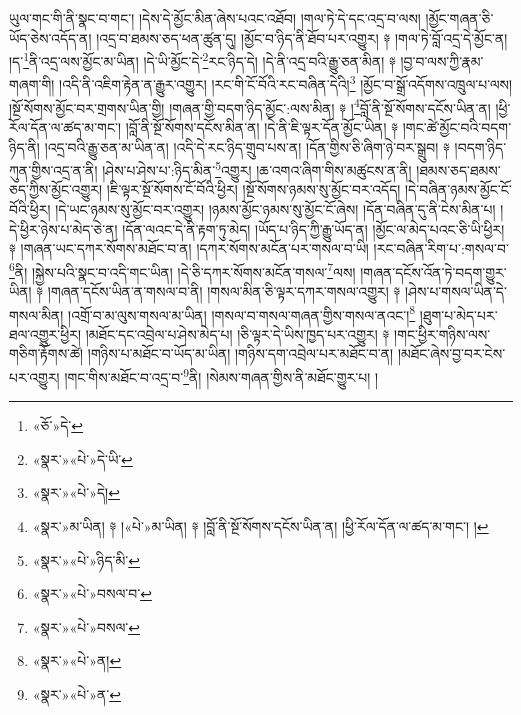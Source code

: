 ཡུལ་གང་གི་ནི་སྣང་བ་གང་། །དེས་དེ་མྱོང་མིན་ཞེས་པའང་འཐོབ། །གལ་ཏེ་དེ་དང་འདྲ་བ་ལས། །མྱོང་གཞན་ཅི་ཡོད་ཅེས་འདོད་ན། །འདྲ་བ་ཐམས་ཅད་ཕན་ཚུན་དུ། །མྱོང་བ་ཉིད་ནི་ཐོབ་པར་འགྱུར། ༈ །གལ་ཏེ་བློ་འདྲ་དེ་མྱོང་ན། །ད་\footnote{«ཅོ་»དེ་}ནི་འདྲ་ལས་མྱོང་མ་ཡིན། །དེ་ཡི་མྱོང་དེ་\footnote{«སྣར་»«པེ་»དེ་ཡི་}རང་ཉིད་དེ། །དེ་ནི་འདྲ་བའི་རྒྱུ་ཅན་མིན། ༈ །བྱ་བ་ལས་ཀྱི་རྣམ་གཞག་གི། །འདི་ནི་འཇིག་རྟེན་ན་རྒྱུར་འགྱུར། །རང་གི་ངོ་བོའི་རང་བཞིན་དེའི།\footnote{«སྣར་»«པེ་»དེ།} །མྱོང་བ་སྒྲོ་འདོགས་འཁྲུལ་པ་ལས། །སྔོ་སོགས་མྱོང་བར་གྲགས་ཡིན་གྱི། །གཞན་གྱི་བདག་ཉིད་མྱོང་:ལས་མིན། ༈ །\footnote{«སྣར་»མ་ཡིན། ༈ །«པེ་»མ་ཡིན། ༈ །བློ་ནི་སྔོ་སོགས་དངོས་ཡིན་ན། །ཕྱི་རོལ་དོན་ལ་ཚད་མ་གང་། །}བློ་ནི་སྔོ་སོགས་དངོས་ཡིན་ན། །ཕྱི་རོལ་དོན་ལ་ཚད་མ་གང་། །བློ་ནི་སྔོ་སོགས་དངོས་མིན་ན། །དེ་ནི་ཇི་ལྟར་དོན་མྱོང་ཡིན། ༈ །གང་ཚེ་མྱོང་བའི་བདག་ཉིད་ནི། །འདྲ་བའི་རྒྱུ་ཅན་མ་ཡིན་ན། །འདི་དེ་རང་ཉིད་གྲུབ་པས་ན། །དོན་གྱིས་ཅི་ཞིག་ཉེ་བར་སྒྲུབ། ༈ །བདག་ཉིད་ཀུན་གྱིས་འདྲ་ན་ནི། །ཤེས་པ་ཤེས་པ་:ཉིད་མིན་\footnote{«སྣར་»«པེ་»ཉིད་མི་}འགྱུར། །ཆ་འགའ་ཞིག་གིས་མཚུངས་ན་ནི། །ཐམས་ཅད་ཐམས་ཅད་ཀྱིས་མྱོང་འགྱུར། །ཇི་ལྟར་སྔོ་སོགས་ངོ་བོའི་ཕྱིར། །སྔོ་སོགས་ཉམས་སུ་མྱོང་བར་འདོད། །དེ་བཞིན་ཉམས་མྱོང་ངོ་བོའི་ཕྱིར། །དེ་ཡང་ཉམས་སུ་མྱོང་བར་འགྱུར། །ཉམས་མྱོང་ཉམས་སུ་མྱོང་ངོ་ཞེས། །དོན་བཞིན་དུ་ནི་ངེས་མིན་པ། །དེ་ཕྱིར་ཉེས་པ་མེད་ཅེ་ན། །དོན་ལའང་དེ་ནི་རྟག་ཏུ་མེད། །ཡོད་པ་ཉིད་ཀྱི་རྒྱུ་ཡོད་ན། །མྱོང་ལ་མེད་པའང་ཅི་ཡི་ཕྱིར། ༈ །གཞན་ཡང་དཀར་སོགས་མཐོང་བ་ན། །དཀར་སོགས་མངོན་པར་གསལ་བ་ཡི། །རང་བཞིན་རིག་པ་:གསལ་བ་\footnote{«སྣར་»«པེ་»བསལ་བ་}ནི། །སྐྱེས་པའི་སྣང་བ་འདི་གང་ཡིན། །དེ་ཅི་དཀར་སོགས་མངོན་གསལ་\footnote{«སྣར་»«པེ་»བསལ་}ལས། །གཞན་དངོས་འོན་ཏེ་བདག་གྱུར་ཡིན། ༈ །གཞན་དངོས་ཡིན་ན་གསལ་བ་ནི། །གསལ་མིན་ཅི་ལྟར་དཀར་གསལ་འགྱུར། ༈ །ཤེས་པ་གསལ་ཡིན་དེ་གསལ་མིན། །འགྲོ་བ་མ་ལུས་གསལ་མ་ཡིན། །གསལ་བ་གསལ་གཞན་གྱིས་གསལ་ནའང་།\footnote{«སྣར་»«པེ་»ན།} །ཐུག་པ་མེད་པར་ཐལ་འགྱུར་ཕྱིར། །མཐོང་དང་འབྲེལ་པ་ཤེས་མེད་པ། །ཅི་ལྟར་དེ་ཡིས་ཁྱད་པར་འགྱུར། ༈ །གང་ཕྱིར་གཉིས་ལས་གཅིག་རྟོགས་ཚེ། །གཉིས་པ་མཐོང་བ་ཡོད་མ་ཡིན། །གཉིས་དག་འབྲེལ་པར་མཐོང་བ་ན། །མཐོང་ཞེས་བྱ་བར་ངེས་པར་འགྱུར། །གང་གིས་མཐོང་བ་འདྲ་བ་\footnote{«སྣར་»«པེ་»ན་}ནི། །སེམས་གཞན་གྱིས་ནི་མཐོང་གྱུར་པ། །
